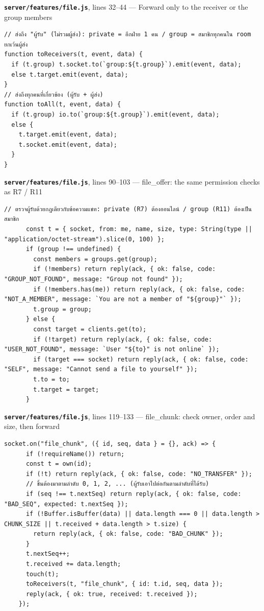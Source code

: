 \documentclass[11pt,a4paper]{article}
\newcommand{\code}[1]{\texttt{#1}}
\newcommand{\snap}[3]{\par\medskip\textbf{\code{#1}}, lines #2 --- #3}
\begin{document}
\snap{server/features/file.js}{32--44}{Forward only to the receiver or the group members}
\begin{Verbatim}[firstnumber=32]
// ส่งถึง "ผู้รับ" (ไม่รวมผู้ส่ง): private = อีกฝ่าย 1 คน / group = สมาชิกทุกคนใน room ยกเว้นผู้ส่ง
function toReceivers(t, event, data) {
  if (t.group) t.socket.to(`group:${t.group}`).emit(event, data);
  else t.target.emit(event, data);
}
// ส่งถึงทุกคนที่เกี่ยวข้อง (ผู้รับ + ผู้ส่ง)
function toAll(t, event, data) {
  if (t.group) io.to(`group:${t.group}`).emit(event, data);
  else {
    t.target.emit(event, data);
    t.socket.emit(event, data);
  }
}
\end{Verbatim}

\snap{server/features/file.js}{90--103}{file\_offer: the same permission checks as R7 / R11}
\begin{Verbatim}[firstnumber=90]
      // ตรวจผู้รับด้วยกฎเดียวกับข้อความแชท: private (R7) ต้องออนไลน์ / group (R11) ต้องเป็นสมาชิก
      const t = { socket, from: me, name, size, type: String(type || "application/octet-stream").slice(0, 100) };
      if (group !== undefined) {
        const members = groups.get(group);
        if (!members) return reply(ack, { ok: false, code: "GROUP_NOT_FOUND", message: "Group not found" });
        if (!members.has(me)) return reply(ack, { ok: false, code: "NOT_A_MEMBER", message: `You are not a member of "${group}"` });
        t.group = group;
      } else {
        const target = clients.get(to);
        if (!target) return reply(ack, { ok: false, code: "USER_NOT_FOUND", message: `User "${to}" is not online` });
        if (target === socket) return reply(ack, { ok: false, code: "SELF", message: "Cannot send a file to yourself" });
        t.to = to;
        t.target = target;
      }
\end{Verbatim}

\snap{server/features/file.js}{119--133}{file\_chunk: check owner, order and size, then forward}
\begin{Verbatim}[firstnumber=119]
    socket.on("file_chunk", ({ id, seq, data } = {}, ack) => {
      if (!requireName()) return;
      const t = own(id);
      if (!t) return reply(ack, { ok: false, code: "NO_TRANSFER" });
      // ชิ้นต้องมาตามลำดับ 0, 1, 2, ... (ผู้รับเอาไปต่อกันตามลำดับที่ได้รับ)
      if (seq !== t.nextSeq) return reply(ack, { ok: false, code: "BAD_SEQ", expected: t.nextSeq });
      if (!Buffer.isBuffer(data) || data.length === 0 || data.length > CHUNK_SIZE || t.received + data.length > t.size) {
        return reply(ack, { ok: false, code: "BAD_CHUNK" });
      }
      t.nextSeq++;
      t.received += data.length;
      touch(t);
      toReceivers(t, "file_chunk", { id: t.id, seq, data });
      reply(ack, { ok: true, received: t.received });
    });
\end{Verbatim}
\end{document}
